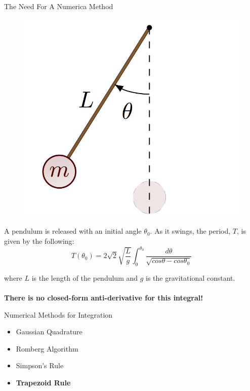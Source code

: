 \documentclass[t]{beamer}
\begin{document}
\begin{frame}{The Need For A Numerica Method}

\begin{multicols}{2}
\begin{figure}
    \centering
    \includegraphics[width=0.7\linewidth]{pendulum.png}
\end{figure}

\vfill\null
\columnbreak

A pendulum is released with an initial angle $\theta_0$. As it swings, the period, $T$, is given by the following:
\pause
\[T(\theta_0)=2\sqrt{2}\sqrt{\frac{L}{g}}\int_0^{\theta_0} \frac{d\theta}{\sqrt{cos \theta - cos \theta_0}}\]

where $L$ is the length of the pendulum and $g$ is the gravitational constant.
\pause
\\
\\
\textbf{There is no closed-form anti-derivative for this integral!}
\end{multicols}
\end{frame}

\begin{frame}{Numerical Methods for Integration}
\begin{itemize}
\item Gaussian Quadrature
\item Romberg Algorithm
\item Simpson's Rule
\item \textbf{Trapezoid Rule}
\end{itemize}
\end{frame}
\end{document}
